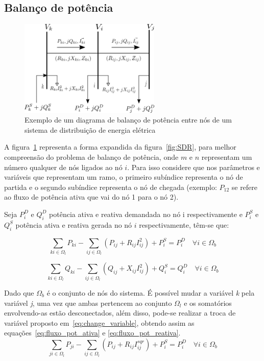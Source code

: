 \subsection{Balanço de potência}

\begin{figure}[H]
    \centering
    \includegraphics[width=0.6\textwidth]{3_Methodology/diagrama_nos.png}
    \caption{Exemplo de um diagrama de balanço de potência entre nós de um sistema de distribuição de energia elétrica}
    \label{fig:balanco_pot}
\end{figure}

A figura~\ref{fig:balanco_pot} representa a forma expandida da figura~\ref{fig:SDR}, para melhor compreensão do problema de balanço de potência, onde $m$ e $n$ representam um número qualquer de nós ligados ao nó $i$. 
Para isso considere que nos parâmetros e variáveis que representam um ramo, o primeiro subíndice representa o nó de partida e o segundo subíndice representa o nó de chegada (exemplo: $P_{12}$ se refere ao fluxo de potência ativa que vai do nó 1 para o nó 2).

Seja $P_{i}^{D}$ e $Q_{i}^{D}$ potência ativa e reativa demandada no nó i respectivamente e $P_{i}^{S}$ e $Q_{i}^{S}$ potência ativa e reativa gerada no nó $i$ respectivamente, têm-se que:

\begin{equation*}
    \sum_{ki\in\Omega_{l}}P_{ki} - \sum_{ij\in\Omega_{l}}(P_{ij} + R_{ij}I_{ij}^{2}) + P_{i}^{S} = P_{i}^{D}\quad\forall i \in\Omega_{b}
\end{equation*}

\begin{equation*}
    \sum_{ki\in\Omega_{l}}Q_{ki} - \sum_{ij\in\Omega_{l}}(Q_{ij} + X_{ij}I_{ij}^{2}) + Q_{i}^{S} = Q_{i}^{D}\quad\forall i \in\Omega_{b}
\end{equation*}

Dado que $\Omega_{b}$ é o conjunto de nós do sistema.
É possível mudar a variável \textit{k} pela variável \textit{j}, uma vez que ambas pertencem ao conjunto $\Omega_{l}$ e os somatórios envolvendo-as estão desconectados, além disso, pode-se realizar a troca de variável proposto em~\ref{eq:change_variable}, obtendo assim as equações~\ref{eq:fluxo_pot_ativa} e \ref{eq:fluxo_pot_reativa}.
\begin{equation}
    \sum_{ji\in\Omega_{l}}P_{ji} - \sum_{ij\in\Omega_{l}}(P_{ij} + R_{ij}I_{ij}^{sqr}) + P_{i}^{S} = P_{i}^{D}\quad\forall i \in\Omega_{b}\label{eq:fluxo_pot_ativa}  
\end{equation}

